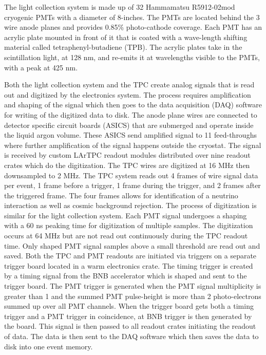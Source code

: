 The light collection system is made up of 32 Hammamatsu R5912-02mod cryogenic PMTs with a diameter of 8-inches. The PMTs are located behind the 3 wire anode planes and provides 0.85\% photo-cathode coverage. Each PMT has an acrylic plate mounted in front of it that is coated with a wave-length shifting material called tetraphenyl-butadiene (TPB). The acrylic plates take in the scintillation light, at 128 nm, and re-emits it at wavelengths visible to the PMTs, with a peak at 425 nm. 

Both the light collection system and the TPC create analog signals that is read out and digitized by the electronics system. The process requires amplification and shaping of the signal which then goes to the data acquisition (DAQ) software for writing of the digitized data to disk. The anode plane wires are connected to detector specific circuit boards (ASICS) that are submerged and operate inside the liquid argon volume. These ASICS send amplified signal to 11 feed-throughs where further amplification of the signal happens outside the cryostat. The signal is received by custom LArTPC readout modules distributed over nine readout crates which do the digitization. The TPC wires are digitized at 16 MHz then downsampled to 2 MHz. The TPC system reads out 4 frames of wire signal data per event, 1 frame before a trigger, 1 frame during the trigger, and 2 frames after the triggered frame. The four frames allows for identification of a neutrino interaction as well as cosmic background rejection. The process of digitization is similar for the light collection system. Each PMT signal undergoes a shaping with a 60 ns  peaking time for digitization of multiple samples. The digitization occurs at 64 MHz but are not read out continuously during the TPC readout time. Only shaped PMT signal samples above a small threshold are read out and saved. Both the TPC and PMT readouts are initiated via triggers on a separate trigger board located in a warm electronics crate. The timing trigger is created by a timing signal from the BNB accelerator which is shaped and sent to the trigger board. The PMT trigger is generated when the PMT signal multiplicity is greater than 1 and the summed PMT pulse-height is more than 2 photo-electrons summed up over all PMT channels. When the trigger board gets both a timing trigger and a PMT trigger in coincidence, at BNB trigger is then generated by the board. This signal is then passed to all readout crates initiating the readout of data. The data is then sent to the DAQ software which then saves the data to disk into one event memory.

